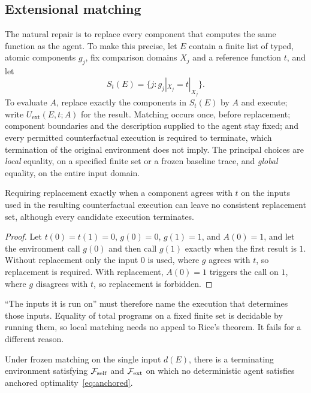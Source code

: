 \subsection{Extensional matching}\label{sec:extensional}

The natural repair is to replace every component that computes the same function as the agent.
To make this precise, let $E$ contain a finite list of typed, atomic components $g_j$, fix comparison
domains $X_j$ and a reference function $t$, and let
\[
  S_t(E)=\{j: g_j|_{X_j}=t|_{X_j}\}.
\]
To evaluate $A$, replace exactly the components in $S_t(E)$ by $A$ and execute; write
$U_{\mathrm{ext}}(E,t;A)$ for the result. Matching occurs once, before replacement; component
boundaries and the description supplied to the agent stay fixed; and every permitted counterfactual
execution is required to terminate, which termination of the original environment does not imply.
The principal choices are \emph{local} equality, on a specified finite set or a frozen baseline
trace, and \emph{global} equality, on the entire input domain.

\begin{proposition}\label{prop:tracematch}
Requiring replacement exactly when a component agrees with $t$ on the inputs used in the resulting
counterfactual execution can leave no consistent replacement set, although every candidate
execution terminates.
\end{proposition}

\begin{proof}
Let $t(0)=t(1)=0$, $g(0)=0$, $g(1)=1$, and $A(0)=1$, and let the environment call $g(0)$ and then call
$g(1)$ exactly when the first result is $1$. Without replacement only the input $0$ is used, where $g$
agrees with $t$, so replacement is required. With replacement, $A(0)=1$ triggers the call on $1$, where
$g$ disagrees with $t$, so replacement is forbidden.
\end{proof}

\enquote{The inputs it is run on} must therefore name the execution that determines those inputs.
Equality of total programs on a fixed finite set is decidable by running them, so local matching
needs no appeal to Rice's theorem. It fails for a different reason.

\begin{theorem}\label{thm:localmatch}
Under frozen matching on the single input $d(E)$, there is a terminating environment satisfying
$\mathcal{F}_{\mathrm{self}}$ and $\mathcal{F}_{\mathrm{ext}}$ on which no deterministic agent satisfies anchored
optimality~\eqref{eq:anchored}.
\end{theorem}

